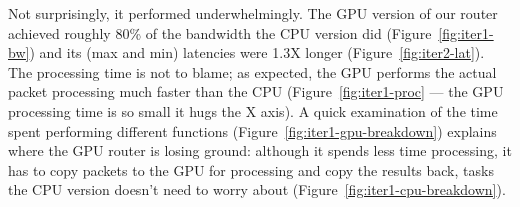Not surprisingly, it performed underwhelmingly. The GPU version of our router
achieved roughly 80\% of the bandwidth the CPU version did
(Figure~\ref{fig:iter1-bw}) and its (max and min) latencies were 1.3X longer
(Figure~\ref{fig:iter2-lat}). The processing time is not to blame; as expected,
the GPU performs the actual packet processing much faster than the CPU
(Figure~\ref{fig:iter1-proc} --- the GPU processing time is so small it hugs
the X axis). A quick examination of the time spent performing different
functions (Figure~\ref{fig:iter1-gpu-breakdown}) explains where the GPU router
is losing ground: although it spends less time processing, it has to copy
packets to the GPU for processing and copy the results back, tasks the CPU
version doesn't need to worry about (Figure~\ref{fig:iter1-cpu-breakdown}).

\begin{figure}
    \centering
	\medskip


	\medskip
    
	\medskip
	

\end{figure}
